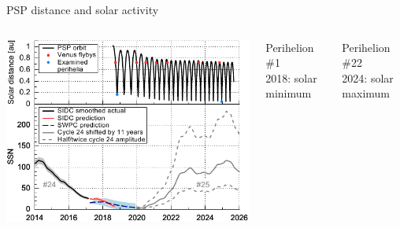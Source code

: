 \begin{frame}[plain,c]{PSP distance and solar activity}{}
	\begin{columns}[c]
		
		\includegraphics[width=\textwidth]{../figures_paper/SPP_orbit_predicted_SSN_overview_f_plot.pdf}

		
		Perihelion \#1\\
		2018: solar minimum\\\ 
		
		Perihelion \#22\\
		2024: solar maximum

	\end{columns}
\end{frame}

